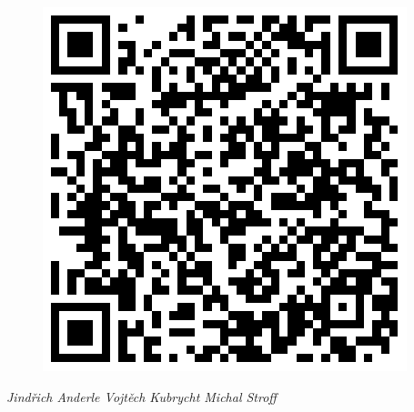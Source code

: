 \documentclass[12pt]{article}
\begin{document}
\begin{figure}[H]
      \includegraphics[scale=0.3]{../../../../propagace/qrcodes/dotaznik.png}
    \endminipage
  \end{figure}
\vspace{1,5cm}
\begin{center}
  \textit{Jindřich Anderle Vojtěch Kubrycht Michal Stroff\\}
  \vspace{0.5cm}
\end{center}
\vspace*{\fill}
\end{document}
